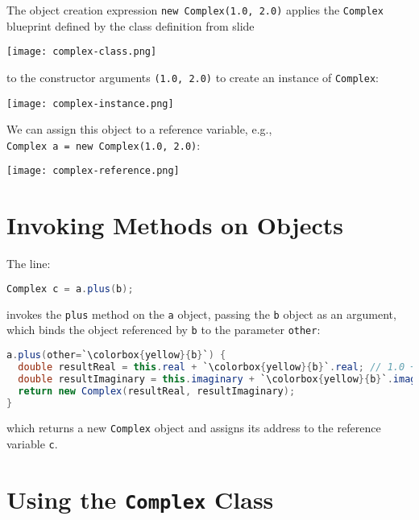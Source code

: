 \documentclass{article}
\begin{document}
The object creation expression {\tt new Complex(1.0, 2.0)}
applies the {\tt Complex} blueprint defined by the class definition from slide %

\begin{center}
\texttt{[image: complex-class.png]}
\end{center}

to the constructor arguments {\tt (1.0, 2.0)} to create an instance of {\tt Complex}:

\begin{center}
\texttt{[image: complex-instance.png]}
\end{center}

We can assign this object to a reference variable, e.g.,\\ {\tt Complex a = new Complex(1.0, 2.0)}:

\begin{center}
\texttt{[image: complex-reference.png]}
\end{center}


\section{Invoking Methods on Objects}


The line:
\begin{lstlisting}[language=Java]
Complex c = a.plus(b);
\end{lstlisting}
invokes the {\tt plus} method on the {\tt a} object, passing the {\tt b} object as an argument, which binds the object referenced by {\tt b} to the parameter {\tt other}:
\begin{lstlisting}[language=Java,escapechar=`]
a.plus(other=`\colorbox{yellow}{b}`) {
  double resultReal = this.real + `\colorbox{yellow}{b}`.real; // 1.0 + 3.0
  double resultImaginary = this.imaginary + `\colorbox{yellow}{b}`.imaginary; // 2.0 + 4.0
  return new Complex(resultReal, resultImaginary);
}
\end{lstlisting}
which returns a new {\tt Complex} object and assigns its address to the  reference variable {\tt c}.

\section{Using the {\tt Complex} Class}
\end{document}
